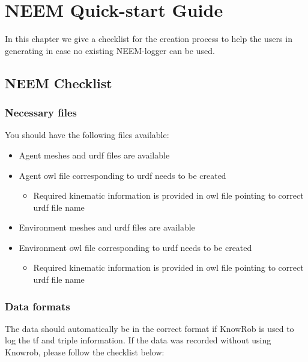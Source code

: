 \chapter{NEEM Quick-start Guide}
\label{ch:initial_checklist}

In this chapter we give a checklist for the \neems creation process to help the users in generating \neems in case no existing NEEM-logger can be used. 

\section{NEEM Checklist}

\subsection{Necessary files}
\label{sec:checklist_files}

You should have the following files available:

\begin{itemize}
	\item Agent meshes and urdf files are available
	\item Agent owl file corresponding to urdf needs to be created
	\begin{itemize}
		\item Required kinematic information is provided in owl file pointing to correct urdf file name 
	\end{itemize}
	\item Environment meshes and urdf files are available
	\item Environment owl file corresponding to urdf needs to be created
	\begin{itemize}
		\item Required kinematic information is provided in owl file pointing to correct urdf file name
	\end{itemize}
\end{itemize}

\subsection{Data formats}

The data should automatically be in the correct format if KnowRob is used to log the tf and triple information. If the data was recorded without using Knowrob, please follow the checklist below:

